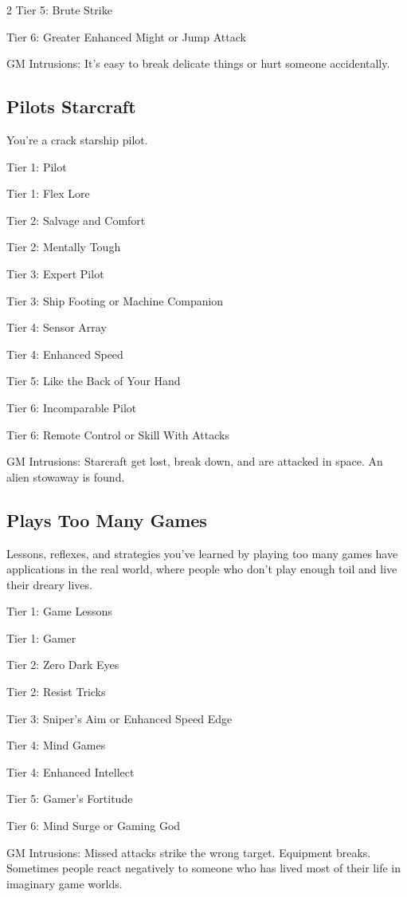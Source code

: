 \begin{multicols}{2}
Tier 5: Brute Strike

Tier 6: Greater Enhanced Might or Jump Attack

GM Intrusions: It’s easy to break delicate things or hurt someone accidentally.

\subsection{Pilots Starcraft}

You’re a crack starship pilot.

Tier 1: Pilot

Tier 1: Flex Lore

Tier 2: Salvage and Comfort

Tier 2: Mentally Tough

Tier 3: Expert Pilot

Tier 3: Ship Footing or Machine Companion

Tier 4: Sensor Array

Tier 4: Enhanced Speed

Tier 5: Like the Back of Your Hand

Tier 6: Incomparable Pilot

Tier 6: Remote Control or Skill With Attacks

GM Intrusions: Starcraft get lost, break down, and are attacked in space. An alien stowaway is found.

\subsection{Plays Too Many Games}

Lessons, reflexes, and strategies you’ve learned by playing too many games have applications in the real world, where people who don’t play enough toil and live their dreary lives.

Tier 1: Game Lessons

Tier 1: Gamer

Tier 2: Zero Dark Eyes

Tier 2: Resist Tricks

Tier 3: Sniper’s Aim or Enhanced Speed Edge

Tier 4: Mind Games

Tier 4: Enhanced Intellect

Tier 5: Gamer’s Fortitude

Tier 6: Mind Surge or Gaming God

GM Intrusions: Missed attacks strike the wrong target. Equipment breaks. Sometimes people react negatively to someone who has lived most of their life in imaginary game worlds.


\end{multicols}
